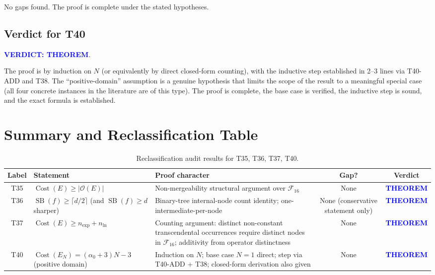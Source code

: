 \documentclass[12pt,a4paper]{article}
\theoremstyle{definition}
\newcommand{\Cost}{\operatorname{Cost}}
\newcommand{\SB}{\operatorname{SB}}
\newcommand{\Fam}{\mathcal{F}}
\newcommand{\verdictTHEOREM}{\textbf{\textcolor{blue}{VERDICT: THEOREM}}}
\begin{document}
No gaps found.  The proof is complete under the stated hypotheses.

\subsection{Verdict for T40}

\verdictTHEOREM.

The proof is by induction on $N$ (or equivalently by direct closed-form
counting), with the inductive step established in 2--3 lines via T40-ADD
and T38.  The ``positive-domain'' assumption is a genuine hypothesis that
limits the scope of the result to a meaningful special case (all four
concrete instances in the literature are of this type).  The proof is
complete, the base case is verified, the inductive step is sound, and the
exact formula is established.

\section{Summary and Reclassification Table}

\begin{table}[h]
\centering
\caption{Reclassification audit results for T35, T36, T37, T40.}
\label{tab:audit}
\smallskip
\begin{tabular}{@{}clp{5.5cm}cc@{}}
\toprule
\textbf{Label} & \textbf{Statement} & \textbf{Proof character}
  & \textbf{Gap?} & \textbf{Verdict} \\
\midrule
T35
  & $\Cost(E) \geq |\mathcal{O}(E)|$
  & Non-mergeability structural argument over $\Fam_{16}$
  & None
  & \textcolor{blue}{\textbf{THEOREM}} \\[6pt]
T36
  & $\SB(f) \geq \lceil d/2 \rceil$
    (and $\SB(f) \geq d$ sharper)
  & Binary-tree internal-node count identity; one-intermediate-per-node
  & None (conservative statement only)
  & \textcolor{blue}{\textbf{THEOREM}} \\[6pt]
T37
  & $\Cost(E) \geq n_{\exp} + n_{\ln}$
  & Counting argument: distinct non-constant transcendental occurrences require
    distinct nodes in $\Fam_{16}$; additivity from operator distinctness
  & None
  & \textcolor{blue}{\textbf{THEOREM}} \\[6pt]
T40
  & $\Cost(E_N) = (\alpha_0+3)N - 3$ (positive domain)
  & Induction on $N$; base case $N=1$ direct; step via T40-ADD + T38;
    closed-form derivation also given
  & None
  & \textcolor{blue}{\textbf{THEOREM}} \\
\bottomrule
\end{tabular}
\end{table}
\end{document}

